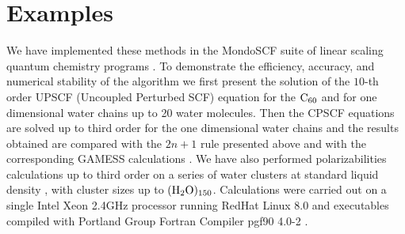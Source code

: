 \documentclass[prl,aps,letterpaper,twocolumn,showpacs,twocolumngrid,superbib]{revtex4}
\begin{document}
\section{Examples}
We have implemented these methods in the MondoSCF suite of linear 
scaling quantum chemistry programs \cite{MondoSCF}.
To demonstrate the efficiency, accuracy, and numerical stability 
of the algorithm we first present
the solution of the $10$-th order UPSCF (Uncoupled Perturbed SCF) 
equation for the $\rm C_{60}$ and for one dimensional water chains up to
20 water molecules. 
Then the CPSCF equations are solved up to third order for the one dimensional 
water chains and the results obtained are compared with the $2n+1$ rule presented 
above and with the corresponding GAMESS calculations \cite{gamess}. We have also 
performed polarizabilities calculations up to third order on a series of water 
clusters at standard liquid density \cite{MChallacombe97,ESchwegler97}, with 
cluster sizes up to $(\rm H_2O)_{150}$. 
Calculations were carried out on a single Intel Xeon 2.4GHz processor 
running RedHat Linux 8.0 and  executables compiled
with Portland Group Fortran Compiler pgf90 4.0-2 \cite{PGF90}.
\end{document}
